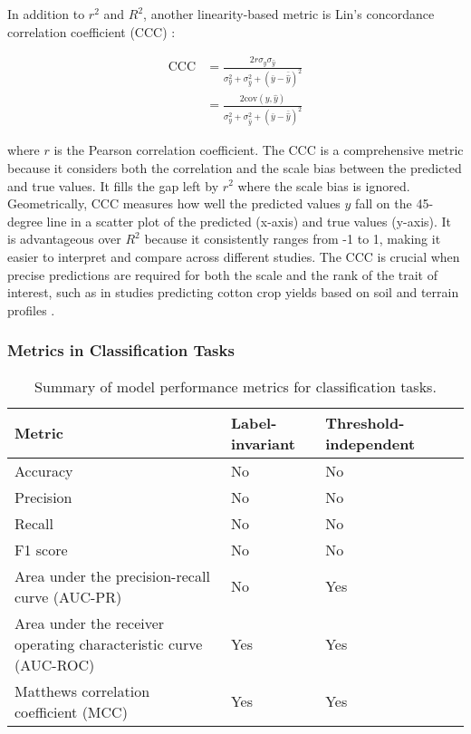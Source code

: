 In addition to \(r^2\) and \(R^2\), another linearity-based metric is Lin's concordance correlation coefficient (CCC) \citep{lin_concordance_1989}:

\begin{equation} \label{eq_ccc}
\begin{aligned}
\text{CCC} &= \frac{2r \sigma_y \sigma_{\hat{y}}}{\sigma_y^2 + \sigma_{\hat{y}}^2 + (\bar{y} - \bar{\hat{y}})^2} \\
&= \frac{2 \text{cov}(y, \hat{y})}{\sigma_y^2 + \sigma_{\hat{y}}^2 + (\bar{y} - \bar{\hat{y}})^2}
\end{aligned}
\end{equation}

where $r$ is the Pearson correlation coefficient. The CCC is a comprehensive metric because it considers both the correlation and the scale bias between the predicted and true values. It fills the gap left by \(r^2\) where the scale bias is ignored. Geometrically, CCC measures how well the predicted values \(\hat{y}\) fall on the 45-degree line in a scatter plot of the predicted (x-axis) and true values (y-axis). It is advantageous over \(R^2\) because it consistently ranges from -1 to 1, making it easier to interpret and compare across different studies. The CCC is crucial when precise predictions are required for both the scale and the rank of the trait of interest, such as in studies predicting cotton crop yields based on soil and terrain profiles \citep{jones_identifying_2022}.

\subsubsection{Metrics in Classification Tasks}


\begin{table}
    \caption{Summary of model performance metrics for classification tasks.}
    \centering
    \begin{tabular}{llll}
        \toprule
        Metric & Label-invariant & Threshold-independent \\
        \midrule
        Accuracy & No & No \\
        Precision & No & No \\
        Recall & No & No \\
        F1 score & No & No \\
        Area under the precision-recall curve (AUC-PR) & No & Yes \\
        Area under the receiver operating characteristic curve (AUC-ROC) & Yes & Yes \\
        Matthews correlation coefficient (MCC) & Yes & Yes \\
        \bottomrule
    \end{tabular}
    \label{tab:metrics-cls}
\end{table}

